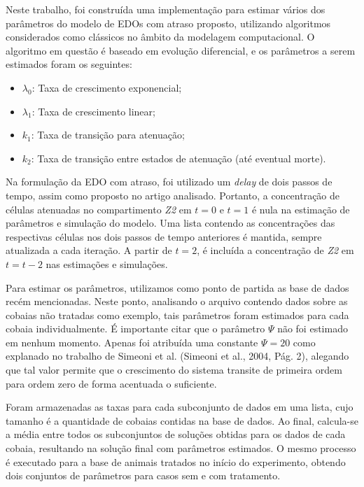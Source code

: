 \documentclass[12pt]{article}
\begin{document}
Neste trabalho, foi construída uma implementação para estimar vários dos parâmetros do modelo de EDOs com atraso proposto, utilizando algoritmos considerados como clássicos no âmbito da modelagem computacional. O algoritmo em questão é baseado em evolução diferencial, e os parâmetros a serem estimados foram os seguintes:

\begin{itemize}
    \setlength{\itemsep}{10pt}
    \item \(\lambda_0\): Taxa de crescimento exponencial;
    \item \(\lambda_1\): Taxa de crescimento linear;
    \item \(k_1\): Taxa de transição para atenuação;
    \item \(k_2\): Taxa de transição entre estados de atenuação (até eventual morte).
\end{itemize}

Na formulação da EDO com atraso, foi utilizado um \emph{delay} de dois passos de tempo, assim como proposto no artigo analisado. Portanto, a concentração de células atenuadas no compartimento \emph{Z2} em \(t = 0\) e \(t = 1\) é nula na estimação de parâmetros e simulação do modelo. Uma lista contendo as concentrações das respectivas células nos dois passos de tempo anteriores é mantida, sempre atualizada a cada iteração. A partir de \(t = 2\), é incluída a concentração de \emph{Z2} em \(t = t - 2\) nas estimações e simulações.    

Para estimar os parâmetros, utilizamos como ponto de partida as base de dados recém mencionadas. Neste ponto, analisando o arquivo contendo dados sobre as cobaias não tratadas como exemplo, tais parâmetros foram estimados para cada cobaia individualmente. É importante citar que o parâmetro \(\Psi\) não foi estimado em nenhum momento. Apenas foi atribuída uma constante \(\Psi=20\) como explanado no trabalho de Simeoni et al. (Simeoni et al., 2004, Pág. 2), alegando que tal valor permite que o crescimento do sistema transite de primeira ordem para ordem zero de forma acentuada o suficiente.

Foram armazenadas as taxas para cada subconjunto de dados em uma lista, cujo tamanho é a quantidade de cobaias contidas na base de dados. Ao final, calcula-se a média entre todos os subconjuntos de soluções obtidas para os dados de cada cobaia, resultando na solução final com parâmetros estimados. O mesmo processo é executado para a base de animais tratados no início do experimento, obtendo dois conjuntos de parâmetros para casos sem e com tratamento.
\end{document}
